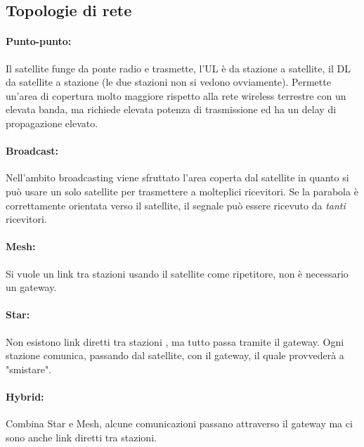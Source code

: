 \subsection{Topologie di rete}

\paragraph{Punto-punto:} Il satellite funge da ponte radio e trasmette, l'UL è da stazione a satellite, il DL da satellite a stazione (le due stazioni non si vedono ovviamente). Permette un'area di copertura molto maggiore rispetto alla rete wireless terrestre con un elevata banda, ma richiede elevata potenza di trasmissione ed ha un delay di propagazione elevato.

\paragraph{Broadcast:} Nell'ambito broadcasting viene sfruttato l'area coperta dal satellite in quanto si può usare un solo satellite per trasmettere a molteplici ricevitori. Se la parabola è correttamente orientata verso il satellite, il segnale può essere ricevuto da \textit{tanti} ricevitori.

\paragraph{Mesh:} Si vuole un link tra stazioni usando il satellite come ripetitore, non è necessario un gateway.

\paragraph{Star:} Non esistono link diretti tra stazioni , ma tutto passa tramite il gateway. Ogni stazione comunica, passando dal satellite, con il gateway, il quale provvederà a "smistare".\\

\paragraph{Hybrid:} Combina Star e Mesh, alcune comunicazioni passano attraverso il gateway ma ci sono anche link diretti tra stazioni.\\

